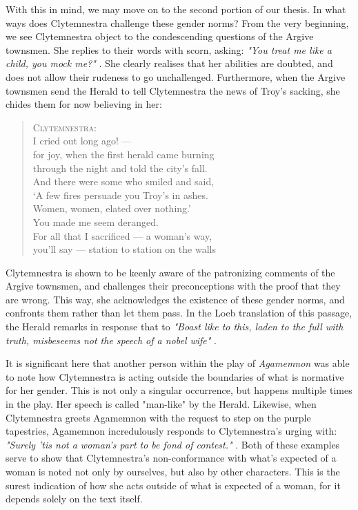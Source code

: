 With this in mind, we may move on to the second portion of our thesis. In what
ways does Clytemnestra challenge these gender norms? From the very beginning,
we see Clytemnestra object to the condescending questions of the Argive
townsmen. She replies to their words with scorn, asking: \emph{"You treat me
like a child, you mock me?"} \autocite[275]{fagles}. She clearly realises that
her abilities are doubted, and does not allow their rudeness to go
unchallenged. Furthermore, when the Argive townsmen send the Herald to tell
Clytemnestra the news of Troy's sacking, she chides them for now believing in
her:

\begin{quote}
  \textsc{Clytemnestra}: \\
  I cried out long ago! --- \\
  for joy, when the first herald came burning \\
  through the night and told the city's fall. \\
  And there were some who smiled and said, \\
  `A few fires persuade you Troy's in ashes. \\
  Women, women, elated over nothing.' \\
  You made me seem deranged. \\
  For all that I sacrificed --- a woman's way, \\
  you'll say --- station to station on the walls

  \autocite[580]{fagles}
\end{quote}

\noindent
Clytemnestra is shown to be keenly aware of the
patronizing comments of the Argive townsmen, and challenges their preconceptions
with the proof that they are wrong. This way, she acknowledges the existence of
these gender norms, and confronts them rather than let them pass. In the Loeb
translation of this passage, the Herald remarks in response that to \emph{"Boast
like to this, laden to the full with truth, misbeseems not the speech of a
nobel wife"} \autocite[613]{loeb}.

\noindent
It is significant here that another person within the play of \emph{Agamemnon}
was able to note how Clytemnestra is acting outside the boundaries of what is
normative for her gender. This is not only a singular occurrence, but happens
multiple times in the play. Her speech is called "man-like" by the Herald.
Likewise, when Clytemnestra greets Agamemnon with the request to step on the
purple tapestries, Agamemnon incredulously responds to Clytemnestra's urging
with: \emph{"Surely 'tis not a woman's part to be fond of contest."}
\autocite[940]{loeb}. Both of these examples serve to show that Clytemnestra's
non-conformance with what's expected of a woman is noted not only by ourselves,
but also by other characters. This is the surest indication of how she acts
outside of what is expected of a woman, for it depends solely on the text
itself.

